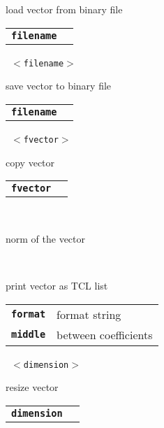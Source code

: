 \begin{description}
\begin{description}
        load vector from binary file

      \begin{tabular}{ll}
 \texttt{\textbf{filename}} &    \\
      \end{tabular}
       \texttt{ $<$filename$>$} \

        save vector to binary file

      \begin{tabular}{ll}
 \texttt{\textbf{filename}} &    \\
      \end{tabular}
       \texttt{ $<$fvector$>$} \

        copy vector

      \begin{tabular}{ll}
 \texttt{\textbf{fvector}} &  \\
      \end{tabular}
       \texttt{} \

        norm of the vector

       \texttt{  } \

        print vector as TCL list

      \begin{tabular}{ll}
 \texttt{\textbf{format}} &  format string  \\
 \texttt{\textbf{middle}} &  between coefficients  \\
      \end{tabular}
       \texttt{ $<$dimension$>$} \

        resize vector

      \begin{tabular}{ll}
 \texttt{\textbf{dimension}} &    \\
      \end{tabular}
    \end{description}

\end{description}

